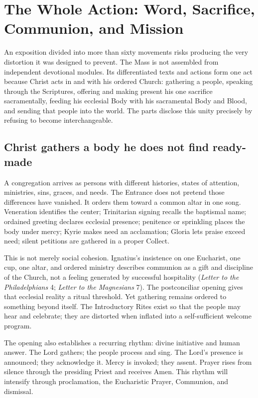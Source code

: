 \section{The Whole Action: Word, Sacrifice, Communion, and Mission}

An exposition divided into more than sixty movements risks producing the very distortion it was designed to prevent. The Mass is not assembled from independent devotional modules. Its differentiated texts and actions form one act because Christ acts in and with his ordered Church: gathering a people, speaking through the Scriptures, offering and making present his one sacrifice sacramentally, feeding his ecclesial Body with his sacramental Body and Blood, and sending that people into the world. The parts disclose this unity precisely by refusing to become interchangeable.

\subsection{Christ gathers a body he does not find ready-made}

A congregation arrives as persons with different histories, states of attention, ministries, sins, graces, and needs. The Entrance does not pretend those differences have vanished. It orders them toward a common altar in one song. Veneration identifies the center; Trinitarian signing recalls the baptismal name; ordained greeting declares ecclesial presence; penitence or sprinkling places the body under mercy; Kyrie makes need an acclamation; Gloria lets praise exceed need; silent petitions are gathered in a proper Collect.

This is not merely social cohesion. Ignatius's insistence on one Eucharist, one cup, one altar, and ordered ministry describes communion as a gift and discipline of the Church, not a feeling generated by successful hospitality (\emph{Letter to the Philadelphians} 4; \emph{Letter to the Magnesians} 7). The postconciliar opening gives that ecclesial reality a ritual threshold. Yet gathering remains ordered to something beyond itself. The Introductory Rites exist so that the people may hear and celebrate; they are distorted when inflated into a self-sufficient welcome program.

The opening also establishes a recurring rhythm: divine initiative and human answer. The Lord gathers; the people process and sing. The Lord's presence is announced; they acknowledge it. Mercy is invoked; they assent. Prayer rises from silence through the presiding Priest and receives Amen. This rhythm will intensify through proclamation, the Eucharistic Prayer, Communion, and dismissal.

